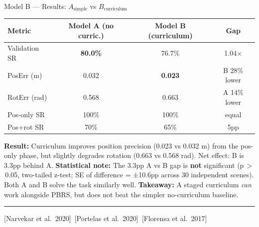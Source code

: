 \documentclass[aspectratio=169,xcolor=dvipsnames,t]{beamer}
\newcommand{\litfooter}[1]{%
  \vspace{2pt}%
  \hrule%
  \vspace{2pt}%
  {\tiny\color{LightDarkGrey} #1}%
}
\begin{document}
\begin{frame}[t]{Model B — Results: $A_{\text{simple}}$ vs $B_{\text{curriculum}}$}
  \begin{center}
  \footnotesize
  \begin{tabular}{lccc}
    \toprule
    \textbf{Metric} & \textbf{Model A (no curric.)} & \textbf{Model B (curriculum)} & \textbf{Gap} \\
    \midrule
    Validation SR & \textcolor{hlgreen}{\textbf{80.0\%}} & 76.7\% & 1.04$\times$ \\
    PosErr (m) & 0.032 & \textcolor{hlgreen}{\textbf{0.023}} & B 28\% lower \\
    RotErr (rad) & 0.568 & 0.663 & A 14\% lower \\
    Pos-only SR & 100\% & 100\% & equal \\
    Pos+rot SR & 70\% & 65\% & 5pp \\
    \bottomrule
  \end{tabular}
  \end{center}
  \vspace{1pt}
  {\scriptsize \textbf{Result:} Curriculum improves position precision (0.023 vs 0.032 m) from the pos-only phase, but slightly degrades rotation (0.663 vs 0.568 rad). Net effect: B is 3.3pp behind A.}
  {\scriptsize \textbf{Statistical note:} The 3.3pp A vs B gap is \textbf{not} significant (p\,$>$\,0.05, two-tailed z-test; SE of difference = ±10.6pp across 30 independent scenes). Both A and B solve the task similarly well.}
  {\scriptsize \textbf{Takeaway:} A staged curriculum \emph{can} work alongside PBRS, but does not beat the simpler no-curriculum baseline.}

  \vfill\litfooter{[Narvekar et al.\ 2020]~[Portelas et al.\ 2020]~[Florensa et al.\ 2017]}
\end{frame}

\end{document}
